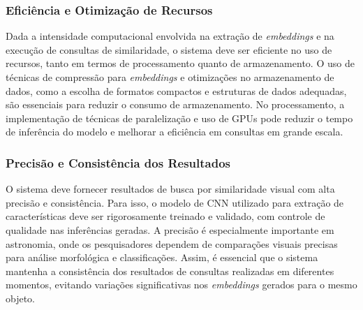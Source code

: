 





\subsubsection{Eficiência e Otimização de Recursos}
\label{sec:req-eficiencia}

Dada a intensidade computacional envolvida na extração de \emph{embeddings} e na execução de consultas de similaridade, o sistema deve ser eficiente no uso de recursos, tanto em termos de processamento quanto de armazenamento. O uso de técnicas de compressão para \emph{embeddings} e otimizações no armazenamento de dados, como a escolha de formatos compactos e estruturas de dados adequadas, são essenciais para reduzir o consumo de armazenamento. No processamento, a implementação de técnicas de paralelização e uso de GPUs pode reduzir o tempo de inferência do modelo e melhorar a eficiência em consultas em grande escala.



\subsubsection{Precisão e Consistência dos Resultados}
\label{sec:req-precisao}

O sistema deve fornecer resultados de busca por similaridade visual com alta precisão e consistência. Para isso, o modelo de CNN utilizado para extração de características deve ser rigorosamente treinado e validado, com controle de qualidade nas inferências geradas. A precisão é especialmente importante em astronomia, onde os pesquisadores dependem de comparações visuais precisas para análise morfológica e classificações. Assim, é essencial que o sistema mantenha a consistência dos resultados de consultas realizadas em diferentes momentos, evitando variações significativas nos \emph{embeddings} gerados para o mesmo objeto.
